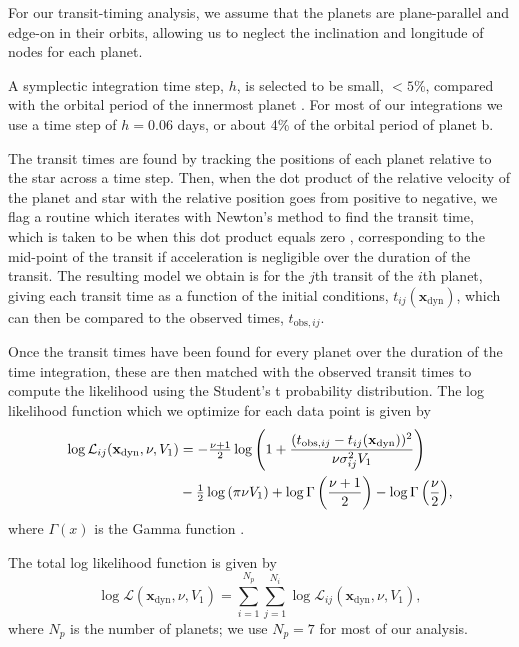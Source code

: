 \documentclass[fleqn,usenatbib]{mnras} %
\begin{document}
For our transit-timing analysis, we assume that the planets are
plane-parallel and edge-on in their orbits, allowing us to neglect
the inclination and longitude of nodes for each planet.

A symplectic integration time step, $h$, is selected to be small,
${<} 5$\%, compared with the orbital period of the innermost planet
\citep{Wisdom1991}. For most of our integrations we use a time step 
of $h=0.06$ days, or about 4\% of the orbital period of planet b.

The transit times are found by tracking the positions of each
planet relative to the star across a time step.  Then, when the
dot product of the relative velocity of the planet and star
with the relative position goes from positive to negative,
we flag a routine which iterates with Newton's method to find
the transit time, which is taken to be when this dot product
equals zero \citep{Fabrycky2010}, corresponding to the mid-point 
of the transit if acceleration is negligible over the duration of the 
transit.  The resulting model we obtain
is for the $j$th transit of the $i$th planet, giving each
transit time as a function of the initial conditions, $t_{ij}(\mathbf{x}_\mathrm{dyn})$, which can then be compared to the observed times, $t_{\mathrm{obs},ij}$.

Once the transit times have been found for every planet over the
duration of the time integration, these are then matched with the observed
transit times to compute the likelihood using the Student's t
probability distribution.  
The log likelihood function which we
optimize for each data point is given by
\begin{equation}
\begin{split}
\log{\mathcal{L}_{ij}}(\mathbf{x}_\mathrm{dyn},\nu,V_1) &= -\tfrac{\nu+1}{2}\log\left(1+\frac{(t_{\mathrm{obs},ij}-t_{ij}(\mathbf{x}_\mathrm{dyn}))^2}{\nu \sigma_{ij}^2 V_1}\right) \\
&-\tfrac{1}{2} \log{\left(\pi \nu V_1\right)} + \log{\Gamma\left(\frac{\nu+1}{2}\right)} - \log{\Gamma\left(\frac{\nu}{2}\right)},\cr
\end{split}
\end{equation}
where $\Gamma(x)$ is the Gamma function \citep{Fisher1925}.

The total log likelihood function is given by
\begin{equation}
    \log{\mathcal{L}}(\mathbf{x}_\mathrm{dyn},\nu,V_1) = \sum_{i=1}^{N_p} \sum_{j=1}^{N_i} \log{\mathcal{L}_{ij}}(\mathbf{x}_\mathrm{dyn},\nu,V_1),
\end{equation}
where $N_p$ is the number of planets; we use $N_p = 7$ for most of our analysis.
\end{document}
